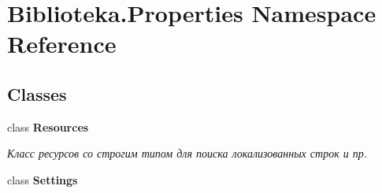 \hypertarget{namespace_biblioteka_1_1_properties}{}\section{Biblioteka.\+Properties Namespace Reference}
\label{namespace_biblioteka_1_1_properties}
\subsection*{Classes}
\begin{DoxyCompactItemize}
\item 
class {\bfseries Resources}
\begin{DoxyCompactList}\small\item\em Класс ресурсов со строгим типом для поиска локализованных строк и пр. \end{DoxyCompactList}\item 
class {\bfseries Settings}
\end{DoxyCompactItemize}
